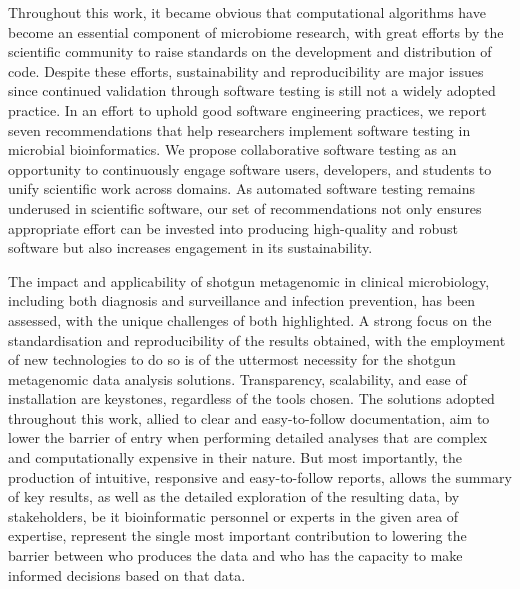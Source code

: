 Throughout this work, it became obvious that computational algorithms have become an essential component of microbiome research, with great efforts by the scientific community to raise standards on the development and distribution of code. Despite these efforts, sustainability and reproducibility are major issues since continued validation through software testing is still not a widely adopted practice. In an effort to uphold good software engineering practices, we report seven recommendations that help researchers implement software testing in microbial bioinformatics. We propose collaborative software testing as an opportunity to continuously engage software users, developers, and students to unify scientific work across domains. As automated software testing remains underused in scientific software, our set of recommendations not only ensures appropriate effort can be invested into producing high-quality and robust software but also increases engagement in its sustainability. 

The impact and applicability of shotgun metagenomic in clinical microbiology, including both diagnosis and surveillance and infection prevention, has been assessed, with the unique challenges of both highlighted. A strong focus on the standardisation and reproducibility of the results obtained, with the employment of new technologies to do so is of the uttermost necessity for the shotgun metagenomic data analysis solutions. Transparency, scalability, and ease of installation are keystones, regardless of the tools chosen. The solutions adopted throughout this work, allied to clear and easy-to-follow documentation, aim to lower the barrier of entry when performing detailed analyses that are complex and computationally expensive in their nature. But most importantly, the production of intuitive, responsive and easy-to-follow reports, allows the summary of key results, as well as the detailed exploration of the resulting data, by stakeholders, be it bioinformatic personnel or experts in the given area of expertise, represent the single most important contribution to lowering the barrier between who produces the data and who has the capacity to make informed decisions based on that data. 